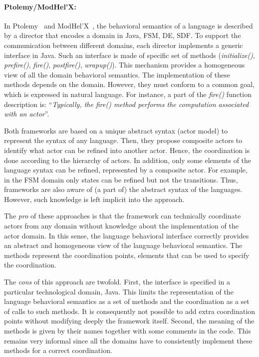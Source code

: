 
\paragraph{Ptolemy/ModHel'X: }
In Ptolemy~\cite{ptoleframebib} and ModHel'X~\cite{modhelxbib}, the behavioral semantics of a language is described by a director that encodes a domain in Java, \eg FSM, DE, SDF. To support the communication between different domains, each director implements a generic interface in Java. Such an interface is made of specific set of methods (\eg \emph{initialize()}, \emph{prefire()}, \emph{fire()}, \emph{postfire()}, \emph{wrapup()}). This mechanism provides a homogeneous view of all the domain behavioral semantics. The implementation of these methods depends on the domain. However, they must conform to a common goal, which is expressed in natural language. For instance, a part of the \emph{fire()} function description is: ``\emph{Typically, the fire() method performs the computation associated with an actor}''. 

Both frameworks are based on a unique abstract syntax (\ie actor model) to represent the syntax of any language. Then, they propose composite actors to identify what actor can be refined into another actor. Hence, the coordination is done according to the hierarchy of actors. In addition, only some elements of the language syntax can be refined, \ie represented by a composite actor. For example, in the FSM domain only states can be refined but not the transitions. Thus, frameworks are also aware of (a part of) the abstract syntax of the languages. However, such knowledge is left implicit into the approach.

The \emph{pro} of these approaches is that the framework can technically coordinate actors from any domain without knowledge about the implementation of the actor domain. In this sense, the language behavioral interface correctly provides an abstract and homogeneous view of the language behavioral semantics. The methods represent the coordination points, \ie elements that can be used to specify the coordination. 

The \emph{cons} of this approach are twofold. First, the interface is specified in a particular technological domain, \ie Java. This limits the representation of the language behavioral semantics as a set of methods and the coordination as a set of calls to such methods. It is consequently not possible to add extra coordination points without modifying deeply the framework itself. Second, the meaning of the methods is given by their names together with some comments in the code. This remains very informal since all the domains have to consistently implement these methods for a correct coordination. 

